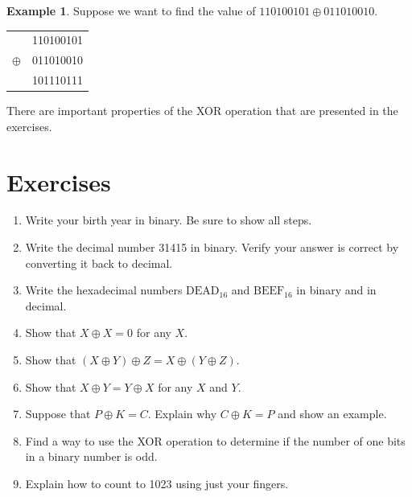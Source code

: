 \documentclass{book}
\theoremstyle{plain}
\theoremstyle{definition}
\newtheorem{example}[theorem]{Example}
\newif\ifprintsolutions
\newcommand{\solution}[1]{\ifprintsolutions \begin{sloppypar}{\it #1}\end{sloppypar} \fi} %
\begin{document}
\begin{example}
Suppose we want to find the value of $110100101 \oplus 011010010$.
\begin{center}
\begin{tabular}{rl}
         & 110100101 \\
$\oplus$ & 011010010 \\
\hline
         & 101110111
\end{tabular}
\end{center}
\end{example}

There are important properties of the XOR operation that are presented in the exercises.

\section{Exercises}
\begin{enumerate}
\item Write your birth year in binary. Be sure to show all steps.
\item Write the decimal number 31415 in binary. Verify your answer is correct by converting it back to decimal. \solution{$31415_{10} = 111101010110111_2$}
\item Write the hexadecimal numbers $\text{DEAD}_{16}$ and $\text{BEEF}_{16}$ in binary and in decimal. \solution{$\text{DEAD}_{16} = 1101111010101101_2 = 57005_{10}, \text{BEEF}_{16} = 1011111011101111_2 = 48879_{10}$}
\item Show that $X \oplus X = 0$ for any $X$. \solution{Each corresponding bit in the summands is identical.}
\item Show that $(X \oplus Y) \oplus Z = X \oplus (Y \oplus Z)$. \solution{Check all possibilities for bits.}
\item Show that $X \oplus Y = Y \oplus X$ for any $X$ and $Y$. \solution{The order of bit comparison is irrelevant.}
\item Suppose that $P \oplus K = C$. Explain why $C \oplus K = P$ and show an example.
\item Find a way to use the XOR operation to determine if the number of one bits in a binary number is odd. \solution{One way is to XOR all the bits together.}
\item Explain how to count to 1023 using just your fingers.
\end{enumerate}
\end{document}
